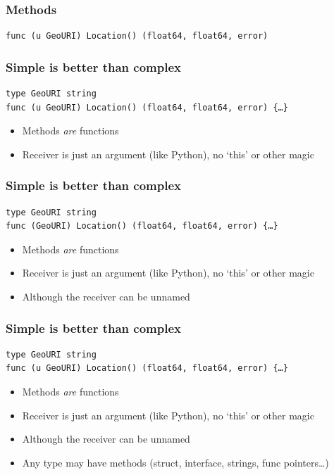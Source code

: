 \documentclass[xelatex,aspectratio=169]{beamer}
\begin{document}
{
\renewcommand{\fcolorbox}[4][]{#4}
\begin{frame}[fragile]
	\frametitle{Methods}
\begin{verbatim}
func (u GeoURI) Location() (float64, float64, error)
\end{verbatim}
\end{frame}

\begin{frame}[fragile]
	\frametitle{Simple is better than complex}
\begin{verbatim}
type GeoURI string
func (u GeoURI) Location() (float64, float64, error) {…}
\end{verbatim}
\begin{itemize}[<+(1)->]
	\item Methods \emph{are} functions
	\item Receiver is just an argument (like Python), no `this' or other magic
\end{itemize}
\end{frame}
\begin{frame}[fragile]
	\frametitle{Simple is better than complex}
\begin{verbatim}
type GeoURI string
func (GeoURI) Location() (float64, float64, error) {…}
\end{verbatim}
\begin{itemize}
	\item Methods \emph{are} functions
	\item Receiver is just an argument (like Python), no `this' or other magic
	\item Although the receiver can be unnamed
\end{itemize}
\end{frame}
\begin{frame}[fragile]
	\frametitle{Simple is better than complex}
\begin{verbatim}
type GeoURI string
func (u GeoURI) Location() (float64, float64, error) {…}
\end{verbatim}
\begin{itemize}
	\item Methods \emph{are} functions
	\item Receiver is just an argument (like Python), no `this' or other magic
	\item Although the receiver can be unnamed
	\item Any type may have methods (struct, interface, strings, func pointers\ldots)
\end{itemize}
\end{frame}

}
\end{document}
